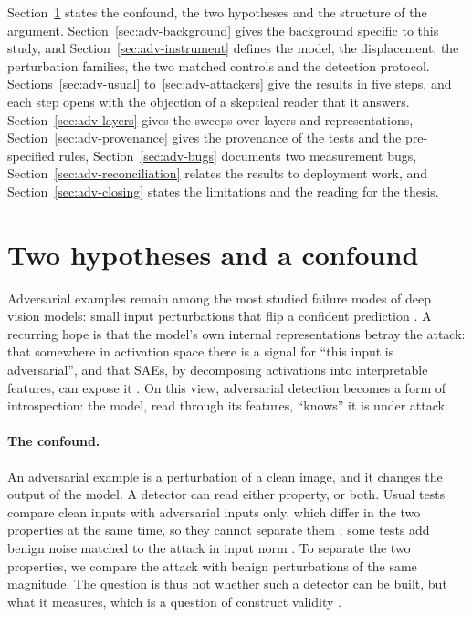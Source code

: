 \documentclass[../ppgc-tese.tex]{subfiles}
\begin{document}
Section~\ref{sec:adv-hypotheses} states the confound, the two hypotheses and
the structure of the argument. Section~\ref{sec:adv-background} gives the
background specific to this study, and Section~\ref{sec:adv-instrument} defines
the model, the displacement, the perturbation families, the two matched
controls and the detection protocol. Sections~\ref{sec:adv-usual}
to~\ref{sec:adv-attackers} give the results in five steps, and each step opens
with the objection of a skeptical reader that it answers.
Section~\ref{sec:adv-layers} gives the sweeps over layers and representations,
Section~\ref{sec:adv-provenance} gives the provenance of the tests and the
pre-specified rules, Section~\ref{sec:adv-bugs} documents two measurement
bugs, Section~\ref{sec:adv-reconciliation} relates the results to deployment
work,
and Section~\ref{sec:adv-closing} states the limitations and the reading for
the thesis.

\section{Two hypotheses and a confound}
\label{sec:adv-hypotheses}

Adversarial examples remain among the most studied failure modes of deep vision
models: small input perturbations that flip a confident prediction
\cite{goodfellow2015fgsm,costa2024adversarial_survey}. A recurring hope is that
the model's own internal representations betray the attack: that somewhere in
activation space there is a signal for ``this input is adversarial'', and that
SAEs, by decomposing activations into interpretable features, can expose it
\cite{rao2024discover_then_name,pach2025sae_monosemantic_vlm}. On this view,
adversarial detection becomes a form of introspection: the model, read through
its features, ``knows'' it is under attack. %

\paragraph*{The confound.}
An adversarial example is a perturbation of a clean image, and it changes the
output of the model. A detector can read either property, or both. Usual tests
compare clean inputs with adversarial inputs only, which differ in the two
properties at the same time, so they cannot separate them
\cite{metzen2017detecting_adversarial,wang2026saegis}; some tests add benign
noise matched to the attack in input norm
\cite{feinman2017adversarial_artifacts,ma2018lid_adversarial}. To separate the
two properties, we compare the attack with benign perturbations of the same
magnitude. The question is thus not whether such a detector can be built, but
what it measures, which is a question of construct validity
\cite{cronbach1955construct_validity,jacobs2021measurement_fairness}.
\end{document}
